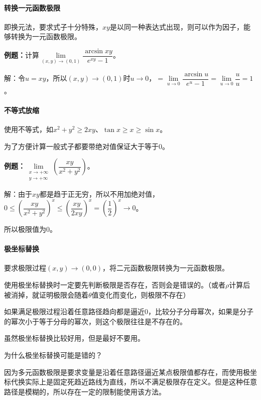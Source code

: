 \documentclass[UTF8, 12pt]{ctexart}
\begin{document}
\paragraph{转换一元函数极限} \leavevmode \medskip

即换元法，要求式子十分特殊，$xy$是以同一种表达式出现，则可以作为因子，能够转换为一元函数极限。

\textbf{例题：}计算$\lim\limits_{(x,y)\to(0,1)}\dfrac{\arcsin xy}{e^{xy}-1}$。

解：令$u=xy$，所以$(x,y)\to(0,1)$时$u\to0$，$=\lim\limits_{u\to0}\dfrac{\arcsin u}{e^u-1}=\lim\limits_{u\to0}\dfrac{u}{u}=1$。

\paragraph{不等式放缩} \leavevmode \medskip

使用不等式，如$x^2+y^2\geqslant2xy$、$\tan x\geqslant x\geqslant\sin x$。

为了方便计算一般式子都要带绝对值保证大于等于0。

\textbf{例题：}$\lim\limits_{\substack{x\to+\infty\\y\to+\infty}}\left(\dfrac{xy}{x^2+y^2}\right)$。

解：由于$xy$都是趋于正无穷，所以不用加绝对值，$0\leqslant\left(\dfrac{xy}{x^2+y^2}\right)^x\leqslant\left(\dfrac{xy}{2xy}\right)^x=\left(\dfrac{1}{2}\right)^x\to0$。

所以极限值为0。

\paragraph{极坐标替换} \leavevmode \medskip

要求极限过程$(x,y)\to(0,0)$，将二元函数极限转换为一元函数极限。

使用极坐标替换时一定要先判断极限是否存在，否则会是错误的。（或者$\rho$计算后被消掉，就证明极限会随着$\theta$值变化而变化，则极限不存在）

如果满足极限过程沿着任意路径趋向都是逼近0，比较分子分母幂次，如果是分子的幂次小于等于分母的幂次，则这个极限往往是不存在的。

虽然极坐标替换比较好用，但是最好不要用。

为什么极坐标替换可能是错的？

因为多元函数极限是要求变量是沿着任意路径逼近某点极限值都存在，而使用极坐标代换实际上是固定死趋近路线为直线，所以不满足极限存在定义。但是这种任意路径是模糊的，所以存在一定的限制能使用该方法。
\end{document}
